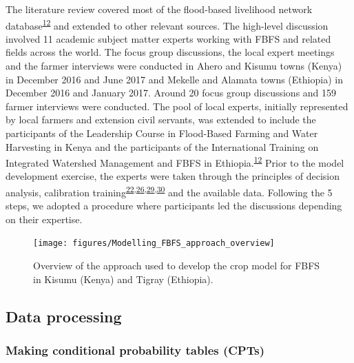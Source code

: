 \documentclass[12pt,oneside]{article}
\begin{document}
The literature review covered most of the flood-based livelihood network database\textsuperscript{\protect\hyperlink{ref-FBLN_2018}{12}} and extended to other relevant sources. The high-level discussion involved 11 academic subject matter experts working with FBFS and related fields across the world. The focus group discussions, the local expert meetings and the farmer interviews were conducted in Ahero and Kisumu towns (Kenya) in December 2016 and June 2017 and Mekelle and Alamata towns (Ethiopia) in December 2016 and January 2017. Around 20 focus group discussions and 159 farmer interviews were conducted. The pool of local experts, initially represented by local farmers and extension civil servants, was extended to include the participants of the Leadership Course in Flood-Based Farming and Water Harvesting in Kenya and the participants of the International Training on Integrated Watershed Management and FBFS in Ethiopia.\textsuperscript{\protect\hyperlink{ref-FBLN_2018}{12}} Prior to the model development exercise, the experts were taken through the principles of decision analysis, calibration training\textsuperscript{\protect\hyperlink{ref-Hubbard_2014}{22},\protect\hyperlink{ref-Luedeling_et_al_2015}{26},\protect\hyperlink{ref-Whitney_et_al_2018}{29},\protect\hyperlink{ref-Whitney_et_al_2018a}{30}} and the available data. Following the 5 steps, we adopted a procedure where participants led the discussions depending on their expertise.

\begin{figure}[!htbp]

{\centering \texttt{[image: figures/Modelling\_FBFS\_approach\_overview]} 

}

\caption{Overview of the approach used to develop the crop model for FBFS in Kisumu (Kenya) and Tigray (Ethiopia).}\label{fig:fig3}
\end{figure}

\hypertarget{III3}{%
\subsection{Data processing}\label{III3}}

\hypertarget{III31}{%
\subsubsection{Making conditional probability tables (CPTs)}\label{III31}}
\end{document}
